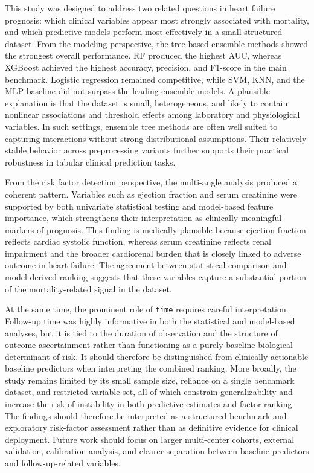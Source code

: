 This study was designed to address two related questions in heart failure prognosis: which clinical variables appear most strongly associated with mortality, and which predictive models perform most effectively in a small structured dataset. From the modeling perspective, the tree-based ensemble methods showed the strongest overall performance. RF produced the highest AUC, whereas XGBoost achieved the highest accuracy, precision, and F1-score in the main benchmark. Logistic regression remained competitive, while SVM, KNN, and the MLP baseline did not surpass the leading ensemble models. A plausible explanation is that the dataset is small, heterogeneous, and likely to contain nonlinear associations and threshold effects among laboratory and physiological variables. In such settings, ensemble tree methods are often well suited to capturing interactions without strong distributional assumptions. Their relatively stable behavior across preprocessing variants further supports their practical robustness in tabular clinical prediction tasks.

From the risk factor detection perspective, the multi-angle analysis produced a coherent pattern. Variables such as ejection fraction and serum creatinine were supported by both univariate statistical testing and model-based feature importance, which strengthens their interpretation as clinically meaningful markers of prognosis. This finding is medically plausible because ejection fraction reflects cardiac systolic function, whereas serum creatinine reflects renal impairment and the broader cardiorenal burden that is closely linked to adverse outcome in heart failure. The agreement between statistical comparison and model-derived ranking suggests that these variables capture a substantial portion of the mortality-related signal in the dataset.

At the same time, the prominent role of \texttt{time} requires careful interpretation. Follow-up time was highly informative in both the statistical and model-based analyses, but it is tied to the duration of observation and the structure of outcome ascertainment rather than functioning as a purely baseline biological determinant of risk. It should therefore be distinguished from clinically actionable baseline predictors when interpreting the combined ranking. More broadly, the study remains limited by its small sample size, reliance on a single benchmark dataset, and restricted variable set, all of which constrain generalizability and increase the risk of instability in both predictive estimates and factor ranking. The findings should therefore be interpreted as a structured benchmark and exploratory risk-factor assessment rather than as definitive evidence for clinical deployment. Future work should focus on larger multi-center cohorts, external validation, calibration analysis, and clearer separation between baseline predictors and follow-up-related variables.
